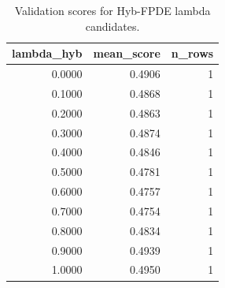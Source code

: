 \begin{table}[t]
\caption{Validation scores for Hyb-FPDE lambda candidates.}
\label{tab:lambda_distribution_computed}
\centering
\begin{tabular}{rrr}
\toprule
lambda\_hyb & mean\_score & n\_rows \\
\midrule
0.0000 & 0.4906 & 1 \\
0.1000 & 0.4868 & 1 \\
0.2000 & 0.4863 & 1 \\
0.3000 & 0.4874 & 1 \\
0.4000 & 0.4846 & 1 \\
0.5000 & 0.4781 & 1 \\
0.6000 & 0.4757 & 1 \\
0.7000 & 0.4754 & 1 \\
0.8000 & 0.4834 & 1 \\
0.9000 & 0.4939 & 1 \\
1.0000 & 0.4950 & 1 \\
\bottomrule
\end{tabular}

\end{table}
